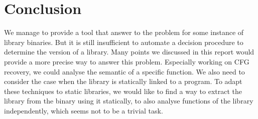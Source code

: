 \documentclass{article}
\begin{document}
    
    \section{Conclusion}
    We manage to provide a tool that answer to the problem for some instance
    of library binaries. But it is still insufficient to automate a decision
    procedure to determine the version of a library. Many points we discussed
    in this report would provide a more precise way to answer this problem.
    Especially working on CFG recovery, we could analyse the semantic of a
    specific function. We also need to consider the case when the library is
    statically linked to a program. To adapt these techniques to static
    libraries, we would like to find a way to extract the library from the binary
    using it statically, to also analyse functions of the library
    independently, which seems not to be a trivial task. 
    

\iffalse    
    \subsection{Other tools}

		\subsubsection{Coccinelle} 
            Coccinelle uses static analysis to find pattern in C source code.
            Using a known bug as a pattern leads to discover if the patch was
            applied or not. It seems not to be interesting in our case,
            because we deal with binaries.  
        \subsubsection{n-gram}
\fi
\end{document}

